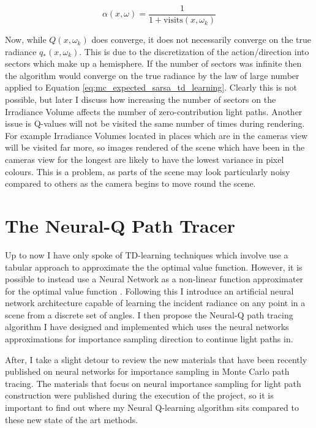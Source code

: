 \documentclass[../dissertation.tex]{subfiles}
\begin{document}
\begin{equation}
\label{eq:decay_lr}
\alpha(x, \omega) = \frac{1}{1 + \text{visits}(x, \omega_k)}
\end{equation}

Now, while $Q(x, \omega_k)$ does converge, it does not necessarily converge on the true radiance $q_*(x, \omega_k)$. This is due to the discretization of the action/direction into sectors which make up a hemisphere. If the number of sectors was infinite then the algorithm would converge on the true radiance by the law of large number applied to Equation \ref{eq:mc_expected_sarsa_td_learning}. Clearly this is not possible, but later I discuss how increasing the number of  sectors on the Irradiance Volume affects the number of zero-contribution light paths. Another issue is Q-values will not be visited the same number of times during rendering. For example Irradiance Volumes located in places which are in the cameras view will be visited far more, so images rendered of the scene which have been in the cameras view for the longest are likely to have the lowest variance in pixel colours. This is a problem, as parts of the scene may look particularly noisy compared to others as the camera begins to move round the scene.

\pagebreak


\section{The Neural-Q Path Tracer}

Up to now I have only spoke of TD-learning techniques which involve use a tabular approach to approximate the the optimal value function. However, it is possible to instead use a Neural Network as a non-linear function approximater for the optimal value function \cite{deep_rl_function_approx}. Following this I introduce an artificial neural network architecture capable of learning the incident radiance on any point in a scene from a discrete set of angles. I then propose the Neural-Q path tracing algorithm I have designed and implemented which uses the neural networks approximations for importance sampling direction to continue light paths in.

After, I take a slight detour to review the new materials that have been recently published on neural networks for importance sampling in Monte Carlo path tracing. The materials that focus on neural importance sampling for light path construction were published during the execution of the project, so it is important to find out where my Neural Q-learning algorithm sits compared to these new state of the art methods.
\end{document}
